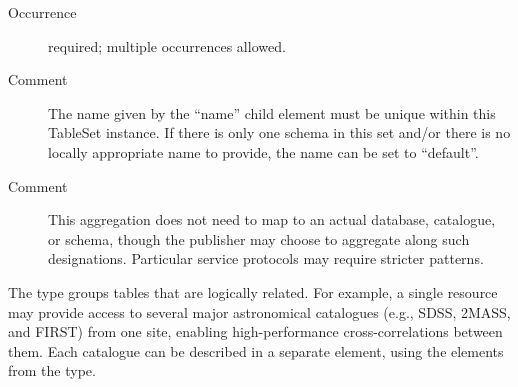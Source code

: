\documentclass[11pt,a4paper]{ivoa}
\begin{document}
\begin{generated}
\begin{bigdescription}
\begin{description}
\item[Occurrence] required; multiple occurrences allowed.
\item[Comment] 
                The name given by the “name” child element must
                be unique within this TableSet instance.  If there is
                only one schema in this set and/or there is no locally
                appropriate name to provide, the name can be set to
                “default”.  
              
\item[Comment] 
                This aggregation does not need to map to an
                actual database, catalogue, or schema, though the
                publisher may choose to aggregate along such
                designations.  Particular service protocols may
                require stricter patterns.
              

\end{description}


\end{bigdescription}\endgroup

\endgroup
\end{generated}



The  type groups
tables that are logically related.
For example, a single
resource may provide access to several major astronomical catalogues
(e.g., SDSS, 2MASS, and FIRST) from one site, enabling high-performance
cross-correlations between them.  Each catalogue can be described in a
separate  element, using the elements from
the  type.
\end{document}
